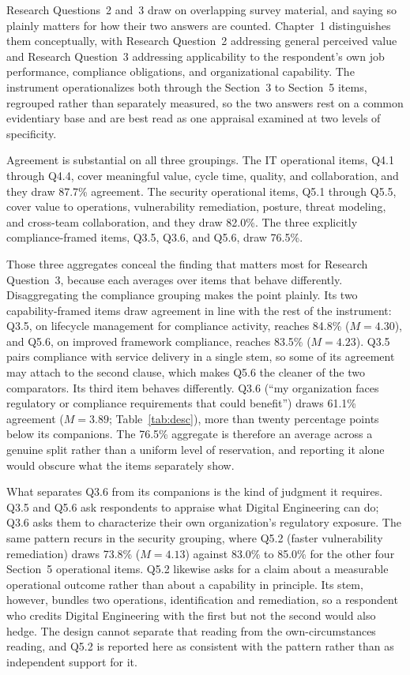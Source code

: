 Research Questions~2 and~3 draw on overlapping survey material, and saying so plainly matters for how their two answers are counted. Chapter~1 distinguishes them conceptually, with Research Question~2 addressing general perceived value and Research Question~3 addressing applicability to the respondent's own job performance, compliance obligations, and organizational capability. The instrument operationalizes both through the Section~3 to Section~5 items, regrouped rather than separately measured, so the two answers rest on a common evidentiary base and are best read as one appraisal examined at two levels of specificity.

Agreement is substantial on all three groupings. The IT operational items, Q4.1 through Q4.4, cover meaningful value, cycle time, quality, and collaboration, and they draw 87.7\% agreement. The security operational items, Q5.1 through Q5.5, cover value to operations, vulnerability remediation, posture, threat modeling, and cross-team collaboration, and they draw 82.0\%. The three explicitly compliance-framed items, Q3.5, Q3.6, and Q5.6, draw 76.5\%.

Those three aggregates conceal the finding that matters most for Research Question~3, because each averages over items that behave differently. Disaggregating the compliance grouping makes the point plainly. Its two capability-framed items draw agreement in line with the rest of the instrument: Q3.5, on lifecycle management for compliance activity, reaches 84.8\% ($M=4.30$), and Q5.6, on improved framework compliance, reaches 83.5\% ($M=4.23$). Q3.5 pairs compliance with service delivery in a single stem, so some of its agreement may attach to the second clause, which makes Q5.6 the cleaner of the two comparators. Its third item behaves differently. Q3.6 (``my organization faces regulatory or compliance requirements that could benefit'') draws 61.1\% agreement ($M=3.89$; Table~\ref{tab:desc}), more than twenty percentage points below its companions. The 76.5\% aggregate is therefore an average across a genuine split rather than a uniform level of reservation, and reporting it alone would obscure what the items separately show.

What separates Q3.6 from its companions is the kind of judgment it requires. Q3.5 and Q5.6 ask respondents to appraise what Digital Engineering can do; Q3.6 asks them to characterize their own organization's regulatory exposure. The same pattern recurs in the security grouping, where Q5.2 (faster vulnerability remediation) draws 73.8\% ($M=4.13$) against 83.0\% to 85.0\% for the other four Section~5 operational items. Q5.2 likewise asks for a claim about a measurable operational outcome rather than about a capability in principle. Its stem, however, bundles two operations, identification and remediation, so a respondent who credits Digital Engineering with the first but not the second would also hedge. The design cannot separate that reading from the own-circumstances reading, and Q5.2 is reported here as consistent with the pattern rather than as independent support for it.

